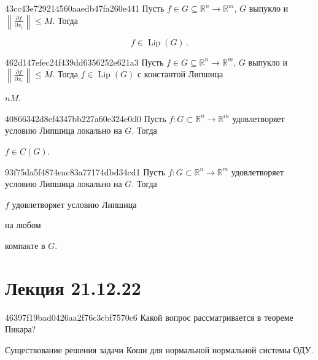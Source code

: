 \begin{note}{43cc43e729214560aaedb47fa260e441}
    Пусть \({ f \in G \subseteq \mathbb R^{n} \to \mathbb R^{m} }\), \({ G }\) выпукло и \({ \left\lVert \frac{\partial f}{\partial x_i} \right\rVert \leqslant M }\).
    Тогда
    \begin{icloze}{1}
        \[
            f \in \operatorname{Lip}(G)\,.
        \]
    \end{icloze}
\end{note}

\begin{note}{462d147efec24f439dd6356252e621a3}
    Пусть \({ f \in G \subseteq \mathbb R^{n} \to \mathbb R^{m} }\), \({ G }\) выпукло и \({ \left\lVert \frac{\partial f}{\partial x_i} \right\rVert \leqslant M }\).
    Тогда \({ f \in \operatorname{Lip}(G) }\) с константой Липшица \begin{icloze}{1}\({ nM }\).\end{icloze}
\end{note}

\begin{note}{40866342d8ef4347bb227a60e324e0d0}
    Пусть \({ f : G \subset \mathbb R^{n} \to \mathbb R^{m} }\) удовлетворяет условию Липшица локально на \({ G }\).
    Тогда \begin{icloze}{1}\({ f \in C(G) }\).\end{icloze}
\end{note}

\begin{note}{93f75da5f4874eac83a77174dbd34cd1}
    Пусть \({ f : G \subset \mathbb R^{n} \to \mathbb R^{m} }\) удовлетворяет условию Липшица локально на \({ G }\).
    Тогда \begin{icloze}{2}\({ f }\) удовлетворяет условию Липшица\end{icloze} на любом \begin{icloze}{1}компакте в \({ G }\).\end{icloze}
\end{note}

\section{Лекция 21.12.22}
\begin{note}{46397f19bad0426aa2f76c3cbf7570c6}
    Какой вопрос рассматривается в теореме Пикара?

    \begin{cloze}{1}
        Существование решения задачи Коши для нормальной нормальной системы ОДУ.
    \end{cloze}
\end{note}

